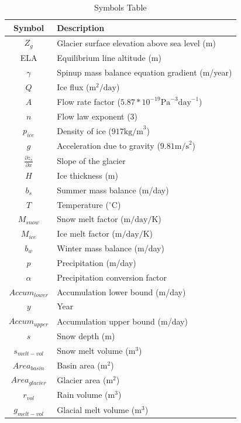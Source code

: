 \documentclass{article}
\begin{document}
\begin{table}[h!]
    \centering
    \begin{tabularx}{\textwidth}{|c|X|}
        \hline
        Symbol & Description \\
        \hline
        $Z_g$ & Glacier surface elevation above sea level (m) \\
        ELA & Equilibrium line altitude (m)\\
        $\gamma$ & Spinup mass balance equation gradient (m/year)\\
        $Q$ & Ice flux ($\text{m}^2/\text{day}$)\\
        $A$ & Flow rate factor ($5.87*10^{-19}\text{Pa}^{-3}\text{day}^{-1}$) \\
        $n$ & Flow law exponent (3) \\
        $p_{ice}$ & Density of ice ($917\text{kg/m}^3$) \\
        $g$ & Acceleration due to gravity ($9.81\text{m/s}^2$) \\
        $\frac{\partial z_s}{\partial x}$ & Slope of the glacier \\
        $H$ & Ice thickness (m)\\
        $b_s$ & Summer mass balance (m/day) \\
        $T$ & Temperature ($^\circ$C) \\$M_{snow}$ & Snow melt factor ($\text{m}/\text{day}/\text{K}$) \\
        $M_{ice}$ & Ice melt factor ($\text{m}/\text{day}/\text{K}$) \\
        $b_w$ & Winter mass balance (m/day) \\
        $p$ & Precipitation (m/day) \\
        $\alpha$ & Precipitation conversion factor \\
        ${Accum}_{lower}$ & Accumulation lower bound (m/day) \\
        $y$ & Year \\
        ${Accum}_{upper}$ & Accumulation upper bound (m/day) \\
        $s$ & Snow depth (m) \\
        $s_{melt-vol}$ & Snow melt volume ($\text{m}^3$) \\
        ${Area}_{basin}$ & Basin area ($\text{m}^2$) \\
        ${Area}_{glacier} $ & Glacier area ($\text{m}^2$) \\
        $r_{vol}$ & Rain volume ($\text{m}^3$) \\
        $g_{melt-vol}$ & Glacial melt volume ($\text{m}^3$) \\
        \hline
    \end{tabularx}
    \caption{Symbols Table}
    \label{tab:symbols_table}
\end{table}
\FloatBarrier
\end{document}
